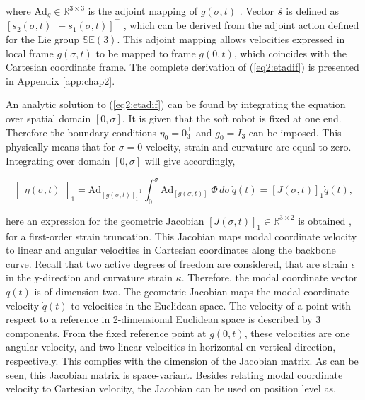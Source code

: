 where $\text{Ad}_g \in \mathbb{R}^{3 \times 3}$ \cite{2DLie} is the adjoint mapping of $g(\sigma,t)$ \cite{Sola2018}. Vector $\Tilde{s}$ is defined as $[s_2(\sigma,t) \hspace{5pt} -s_1(\sigma,t)]^\top$ \cite{2DLie}, which can be derived from the adjoint action defined for the Lie group $\mathbb{SE}(3)$. This adjoint mapping allows velocities expressed in local frame $g(\sigma,t)$ to be mapped to frame $g(0,t)$, which coincides with the Cartesian coordinate frame. The complete derivation of (\ref{eq2:etadif}) is presented in Appendix \ref{app:chap2}. 

An analytic solution to (\ref{eq2:etadif}) can be found by integrating the equation over spatial domain $[0,\sigma]$. It is given that the soft robot is fixed at one end. Therefore the boundary conditions $\eta_0 = 0_{3}^\top$ and $g_0 = I_{3}$ can be imposed. This physically means that for $\sigma = 0$ velocity, strain and curvature are equal to zero. Integrating over domain $[0,\sigma]$ will give accordingly,

\begin{equation}
  \begin{bmatrix} \eta(\sigma,t)\end{bmatrix}_1 = \text{Ad}_{[g(\sigma,t)]_1^{-1}} \int_0^{\sigma} \text{Ad}_{[g(\sigma,t)]_1} \Phi \hspace{2pt} d \sigma  \hspace{2pt} \dot{q}(t) = [J(\sigma,t)]_1\dot{q}(t),
    \label{eq2:J}
\end{equation}

here an expression for the geometric Jacobian $[J(\sigma,t)]_1 \in \mathbb{R}^{3\times 2}$ is obtained \cite{Caasenbrood2020}, for a first-order strain truncation. This Jacobian maps modal coordinate velocity to linear and angular velocities in Cartesian coordinates along the backbone curve. Recall that two active degrees of freedom are considered, that are strain $\epsilon$ in the y-direction and curvature strain $\kappa$. Therefore, the modal coordinate vector $q(t)$ is of dimension two. The geometric Jacobian maps the modal coordinate velocity $\dot{q}(t)$ to velocities in the Euclidean space. The velocity of a point with respect to a reference in 2-dimensional Euclidean space is described by 3 components. From the fixed reference point at $g(0,t)$, these velocities are one angular velocity, and two linear velocities in horizontal en vertical direction, respectively. This complies with the dimension of the Jacobian matrix. As can be seen, this Jacobian matrix is space-variant. Besides relating modal coordinate velocity to Cartesian velocity, the Jacobian can be used on position level as,

